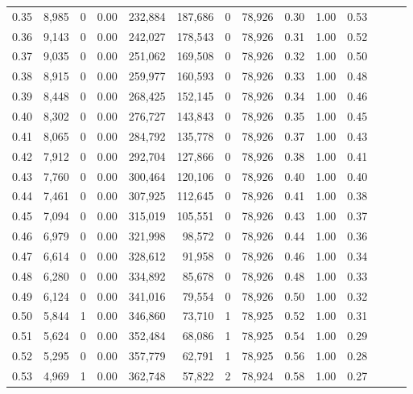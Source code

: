 \begin{tabular}{rrrrrrrrrrrrrr}
0.35 &  8,985 &      0 &  0.00 &  232,884 &  187,686 &       0 &  78,926 &  0.30 &  1.00 &      0.53 \\
0.36 &  9,143 &      0 &  0.00 &  242,027 &  178,543 &       0 &  78,926 &  0.31 &  1.00 &      0.52 \\
0.37 &  9,035 &      0 &  0.00 &  251,062 &  169,508 &       0 &  78,926 &  0.32 &  1.00 &      0.50 \\
0.38 &  8,915 &      0 &  0.00 &  259,977 &  160,593 &       0 &  78,926 &  0.33 &  1.00 &      0.48 \\
0.39 &  8,448 &      0 &  0.00 &  268,425 &  152,145 &       0 &  78,926 &  0.34 &  1.00 &      0.46 \\
0.40 &  8,302 &      0 &  0.00 &  276,727 &  143,843 &       0 &  78,926 &  0.35 &  1.00 &      0.45 \\
0.41 &  8,065 &      0 &  0.00 &  284,792 &  135,778 &       0 &  78,926 &  0.37 &  1.00 &      0.43 \\
0.42 &  7,912 &      0 &  0.00 &  292,704 &  127,866 &       0 &  78,926 &  0.38 &  1.00 &      0.41 \\
0.43 &  7,760 &      0 &  0.00 &  300,464 &  120,106 &       0 &  78,926 &  0.40 &  1.00 &      0.40 \\
0.44 &  7,461 &      0 &  0.00 &  307,925 &  112,645 &       0 &  78,926 &  0.41 &  1.00 &      0.38 \\
0.45 &  7,094 &      0 &  0.00 &  315,019 &  105,551 &       0 &  78,926 &  0.43 &  1.00 &      0.37 \\
0.46 &  6,979 &      0 &  0.00 &  321,998 &   98,572 &       0 &  78,926 &  0.44 &  1.00 &      0.36 \\
0.47 &  6,614 &      0 &  0.00 &  328,612 &   91,958 &       0 &  78,926 &  0.46 &  1.00 &      0.34 \\
0.48 &  6,280 &      0 &  0.00 &  334,892 &   85,678 &       0 &  78,926 &  0.48 &  1.00 &      0.33 \\
0.49 &  6,124 &      0 &  0.00 &  341,016 &   79,554 &       0 &  78,926 &  0.50 &  1.00 &      0.32 \\
0.50 &  5,844 &      1 &  0.00 &  346,860 &   73,710 &       1 &  78,925 &  0.52 &  1.00 &      0.31 \\
0.51 &  5,624 &      0 &  0.00 &  352,484 &   68,086 &       1 &  78,925 &  0.54 &  1.00 &      0.29 \\
0.52 &  5,295 &      0 &  0.00 &  357,779 &   62,791 &       1 &  78,925 &  0.56 &  1.00 &      0.28 \\
0.53 &  4,969 &      1 &  0.00 &  362,748 &   57,822 &       2 &  78,924 &  0.58 &  1.00 &      0.27 \\

\end{tabular}
